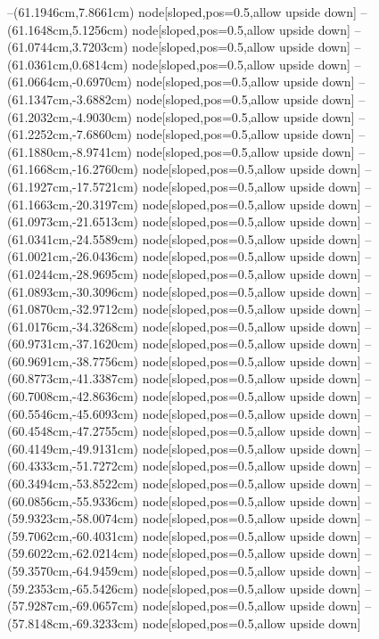 --(61.1946cm,7.8661cm) node[sloped,pos=0.5,allow upside down]{\ArrowIn}
--(61.1648cm,5.1256cm) node[sloped,pos=0.5,allow upside down]{\ArrowIn}
--(61.0744cm,3.7203cm) node[sloped,pos=0.5,allow upside down]{\ArrowIn}
--(61.0361cm,0.6814cm) node[sloped,pos=0.5,allow upside down]{\ArrowIn}
--(61.0664cm,-0.6970cm) node[sloped,pos=0.5,allow upside down]{\ArrowIn}
--(61.1347cm,-3.6882cm) node[sloped,pos=0.5,allow upside down]{\ArrowIn}
--(61.2032cm,-4.9030cm) node[sloped,pos=0.5,allow upside down]{\ArrowIn}
--(61.2252cm,-7.6860cm) node[sloped,pos=0.5,allow upside down]{\ArrowIn}
--(61.1880cm,-8.9741cm) node[sloped,pos=0.5,allow upside down]{\ArrowIn}
--(61.1668cm,-16.2760cm) node[sloped,pos=0.5,allow upside down]{\ArrowIn}
--(61.1927cm,-17.5721cm) node[sloped,pos=0.5,allow upside down]{\ArrowIn}
--(61.1663cm,-20.3197cm) node[sloped,pos=0.5,allow upside down]{\ArrowIn}
--(61.0973cm,-21.6513cm) node[sloped,pos=0.5,allow upside down]{\ArrowIn}
--(61.0341cm,-24.5589cm) node[sloped,pos=0.5,allow upside down]{\ArrowIn}
--(61.0021cm,-26.0436cm) node[sloped,pos=0.5,allow upside down]{\ArrowIn}
--(61.0244cm,-28.9695cm) node[sloped,pos=0.5,allow upside down]{\ArrowIn}
--(61.0893cm,-30.3096cm) node[sloped,pos=0.5,allow upside down]{\ArrowIn}
--(61.0870cm,-32.9712cm) node[sloped,pos=0.5,allow upside down]{\ArrowIn}
--(61.0176cm,-34.3268cm) node[sloped,pos=0.5,allow upside down]{\ArrowIn}
--(60.9731cm,-37.1620cm) node[sloped,pos=0.5,allow upside down]{\ArrowIn}
--(60.9691cm,-38.7756cm) node[sloped,pos=0.5,allow upside down]{\ArrowIn}
--(60.8773cm,-41.3387cm) node[sloped,pos=0.5,allow upside down]{\ArrowIn}
--(60.7008cm,-42.8636cm) node[sloped,pos=0.5,allow upside down]{\ArrowIn}
--(60.5546cm,-45.6093cm) node[sloped,pos=0.5,allow upside down]{\ArrowIn}
--(60.4548cm,-47.2755cm) node[sloped,pos=0.5,allow upside down]{\ArrowIn}
--(60.4149cm,-49.9131cm) node[sloped,pos=0.5,allow upside down]{\ArrowIn}
--(60.4333cm,-51.7272cm) node[sloped,pos=0.5,allow upside down]{\ArrowIn}
--(60.3494cm,-53.8522cm) node[sloped,pos=0.5,allow upside down]{\ArrowIn}
--(60.0856cm,-55.9336cm) node[sloped,pos=0.5,allow upside down]{\ArrowIn}
--(59.9323cm,-58.0074cm) node[sloped,pos=0.5,allow upside down]{\ArrowIn}
--(59.7062cm,-60.4031cm) node[sloped,pos=0.5,allow upside down]{\ArrowIn}
--(59.6022cm,-62.0214cm) node[sloped,pos=0.5,allow upside down]{\ArrowIn}
--(59.3570cm,-64.9459cm) node[sloped,pos=0.5,allow upside down]{\ArrowIn}
--(59.2353cm,-65.5426cm) node[sloped,pos=0.5,allow upside down]{\arrowIn}
--(57.9287cm,-69.0657cm) node[sloped,pos=0.5,allow upside down]{\ArrowIn}
--(57.8148cm,-69.3233cm) node[sloped,pos=0.5,allow upside down]{\arrowIn}
